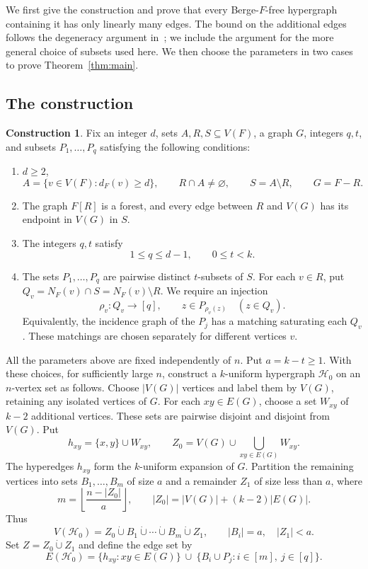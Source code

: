 \documentclass[11pt,a4paper]{article}
\numberwithin{equation}{section}
\theoremstyle{definition}
\newtheorem{construction}[theorem]{Construction}
\theoremstyle{plain}
\newcommand{\HH}{\mathcal H}
\newcommand{\disj}{\mathbin{\dot\cup}}
\begin{document}
We first give the construction and prove that every Berge-$F$-free
hypergraph containing it has only linearly many edges. The bound on
the additional edges follows the degeneracy argument
in~\cite[Lemma~2.2]{EGMT}; we include the argument for the more general
choice of subsets used here. We then choose the parameters in two
cases to prove Theorem~\ref{thm:main}.

\subsection{The construction}\label{sec:construction}

\begin{construction}\label{con:initial}
Fix an integer $d$, sets $A,R,S\subseteq V(F)$, a graph $G$,
integers $q,t$, and subsets $P_1,\ldots,P_q$ satisfying the following
conditions:
\begin{enumerate}[label=\arabic*.,leftmargin=*,itemsep=.4\baselineskip]
\item $d\ge2$,
\[
 A=\{v\in V(F):d_F(v)\ge d\},\qquad R\cap A\ne\varnothing,
 \qquad S=A\setminus R,\qquad G=F-R.
\]
\item The graph $F[R]$ is a forest, and every edge between $R$ and
$V(G)$ has its endpoint in $V(G)$ in $S$.
\item The integers $q,t$ satisfy
\begin{equation}\label{eq:parameters} 
  1\le q\le d-1,\qquad 0\le t<k.
\end{equation}
\item The sets $P_1,\ldots,P_q$ are pairwise distinct $t$-subsets of $S$.
For each $v\in R$, put $Q_v=N_F(v)\cap S=N_F(v)\setminus R$.
We require an injection
\begin{equation}\label{eq:matching}
 \rho_v:Q_v\longrightarrow[q],\qquad
 z\in P_{\rho_v(z)}\quad(z\in Q_v).
\end{equation}
Equivalently, the incidence graph of the $P_j$ has a matching
saturating each $Q_v$. These matchings are chosen separately for
different vertices $v$.
\end{enumerate}
All the parameters above are fixed independently of $n$.
Put $a=k-t\ge1$. With these choices, for sufficiently large $n$,
construct a $k$-uniform hypergraph $\HH_0$ on an $n$-vertex set
as follows. Choose $|V(G)|$ vertices and label them by $V(G)$,
retaining any isolated vertices of $G$. For each $xy\in E(G)$,
choose a set $W_{xy}$ of $k-2$
additional vertices. These sets are pairwise disjoint and disjoint
from $V(G)$. Put
\[
 h_{xy}=\{x,y\}\cup W_{xy},\qquad
 Z_0=V(G)\cup\bigcup_{xy\in E(G)}W_{xy}.
\]
The hyperedges $h_{xy}$ form the $k$-uniform expansion of $G$.
Partition the remaining vertices into sets $B_1,\ldots,B_m$
of size $a$ and a remainder $Z_1$ of size less than $a$, where
\[
 m=\left\lfloor\frac{n-|Z_0|}{a}\right\rfloor,
 \qquad |Z_0|=|V(G)|+(k-2)|E(G)|.
\]
Thus
\[
 V(\HH_0)
 =Z_0\disj B_1\disj\cdots\disj B_m\disj Z_1,
 \qquad |B_i|=a,\quad |Z_1|<a.
\]
Set $Z=Z_0\disj Z_1$ and define the edge set by
\begin{equation}\label{eq:construction}
 E(\HH_0)
 =\{h_{xy}:xy\in E(G)\}
 \ \cup\ \{B_i\cup P_j:i\in[m],\ j\in[q]\}.
\end{equation}
\end{construction}
\end{document}
